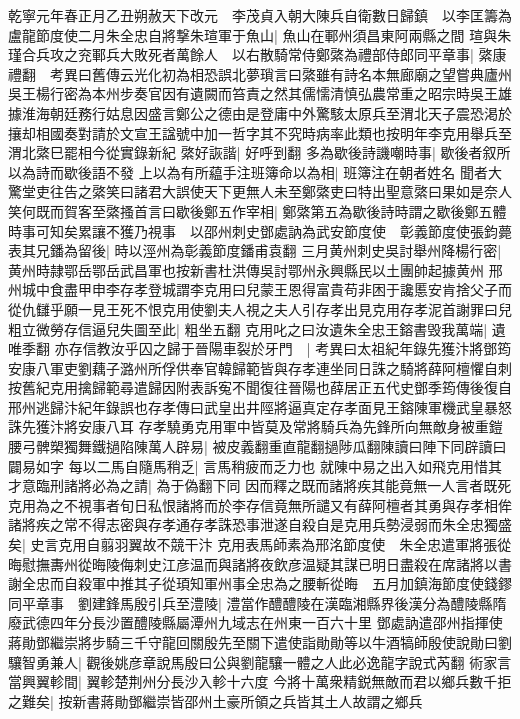 乾寧元年春正月乙丑朔赦天下改元　李茂貞入朝大陳兵自衛數日歸鎮　以李匡籌為盧龍節度使二月朱全忠自將撃朱瑄軍于魚山|{
	魚山在鄆州須昌東阿兩縣之間}
瑄與朱瑾合兵攻之兖鄆兵大敗死者萬餘人　以右散騎常侍鄭綮為禮部侍郎同平章事|{
	綮康禮翻　考異曰舊傳云光化初為相恐誤北夢瑣言曰綮雖有詩名本無廊廟之望嘗典廬州吳王楊行密為本州步奏官因有遺闕而笞責之然其儒懦清慎弘農常重之昭宗時吳王雄據淮海朝廷務行姑息因盛言鄭公之德由是登庸中外驚駭太原兵至渭北天子震恐渇於攘却相國奏對請於文宣王諡號中加一哲字其不究時病率此類也按明年李克用舉兵至渭北綮巳罷相今從實錄新紀}
綮好詼諧|{
	好呼到翻}
多為歇後詩譏嘲時事|{
	歇後者叙所以為詩而歇後語不發}
上以為有所藴手注班簿命以為相|{
	班簿注在朝者姓名}
聞者大驚堂吏往告之綮笑曰諸君大誤使天下更無人未至鄭綮吏曰特出聖意綮曰果如是奈人笑何既而賀客至綮搔首言曰歇後鄭五作宰相|{
	鄭綮第五為歇後詩時謂之歇後鄭五體}
時事可知矣累讓不獲乃視事　以邵州刺史鄧處訥為武安節度使　彰義節度使張鈞薨表其兄鐇為留後|{
	時以涇州為彰義節度鐇甫袁翻}
三月黄州刺史吳討舉州降楊行密|{
	黄州時隷鄂岳鄂岳武昌軍也按新書杜洪傳吳討鄂州永興縣民以土團帥起據黄州}
邢州城中食盡甲申李存孝登城謂李克用曰兒蒙王恩得富貴苟非困于讒慝安肯捨父子而從仇讎乎願一見王死不恨克用使劉夫人視之夫人引存孝出見克用存孝泥首謝罪曰兒粗立微勞存信逼兒失圖至此|{
	粗坐五翻}
克用叱之曰汝遺朱全忠王鎔書毁我萬端|{
	遺唯季翻}
亦存信教汝乎囚之歸于晉陽車裂於牙門　|{
	考異曰太祖紀年錄先獲汴將鄧筠安康八軍吏劉藕子潞州所俘供奉官韓歸範皆與存孝連坐同日誅之騎將薛阿檀懼自刺按舊紀克用擒歸範尋遣歸因附表訴寃不聞復往晉陽也薛居正五代史鄧季筠傳後復自邢州逃歸汴紀年錄誤也存孝傳曰武皇出井陘將逼真定存孝面見王鎔陳軍機武皇暴怒誅先獲汴將安康八耳}
存孝驍勇克用軍中皆莫及常將騎兵為先鋒所向無敵身被重鎧腰弓髀槊獨舞鐵撾陷陳萬人辟易|{
	被皮義翻重直龍翻撾陟瓜翻陳讀曰陣下同辟讀曰闢易如字}
每以二馬自隨馬稍乏|{
	言馬稍疲而乏力也}
就陳中易之出入如飛克用惜其才意臨刑諸將必為之請|{
	為于偽翻下同}
因而釋之既而諸將疾其能竟無一人言者既死克用為之不視事者旬日私恨諸將而於李存信竟無所譴又有薛阿檀者其勇與存孝相侔諸將疾之常不得志密與存孝通存孝誅恐事泄遂自殺自是克用兵勢浸弱而朱全忠獨盛矣|{
	史言克用自翦羽翼故不競干汴}
克用表馬師素為邢洺節度使　朱全忠遣軍將張從晦慰撫夀州從晦陵侮刺史江彦温而與諸將夜飲彦温疑其謀已明日盡殺在席諸將以書謝全忠而自殺軍中推其子從頊知軍州事全忠為之腰斬從晦　五月加鎮海節度使錢鏐同平章事　劉建鋒馬殷引兵至澧陵|{
	澧當作醴醴陵在漢臨湘縣界後漢分為醴陵縣隋廢武德四年分長沙置醴陵縣屬潭州九域志在州東一百六十里}
鄧處訥遣邵州指揮使蔣勛鄧繼崇將步騎三千守龍回關殷先至關下遣使詣勛勛等以牛酒犒師殷使說勛曰劉驤智勇兼人|{
	觀後姚彦章說馬殷曰公與劉龍驤一體之人此必逸龍字說式芮翻}
術家言當興翼軫間|{
	翼軫楚荆州分長沙入軫十六度}
今將十萬衆精鋭無敵而君以鄉兵數千拒之難矣|{
	按新書蔣勛鄧繼崇皆邵州土豪所領之兵皆其土人故謂之鄉兵}
